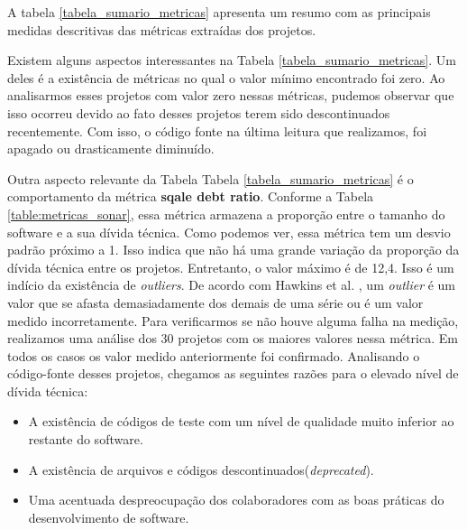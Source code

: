 A tabela \ref{tabela_sumario_metricas} apresenta um resumo com as principais medidas descritivas das métricas extraídas dos projetos. 

Existem alguns aspectos interessantes na Tabela \ref{tabela_sumario_metricas}. Um deles é a existência de métricas no qual o valor mínimo encontrado foi zero. Ao analisarmos esses projetos com valor zero nessas métricas, pudemos observar que isso ocorreu devido ao fato desses projetos terem sido descontinuados recentemente. Com isso, o código fonte na última leitura que realizamos, foi apagado ou drasticamente diminuído.  

Outra aspecto relevante da Tabela Tabela \ref{tabela_sumario_metricas} é o comportamento da métrica \textbf{sqale debt ratio}. Conforme a Tabela \ref{table:metricas_sonar}, essa métrica armazena a proporção entre o tamanho do software e a sua dívida técnica. Como podemos ver, essa métrica tem um desvio padrão próximo a 1. Isso indica que não há uma grande variação da proporção da dívida técnica entre os projetos.  Entretanto, o valor máximo é de 12,4. Isso é um indício da existência de \textit{outliers}. De acordo com Hawkins et al. \cite{hawkins1980identification}, um \textit{outlier} é um valor que se afasta demasiadamente dos demais de uma série ou é um valor medido incorretamente. Para verificarmos se não houve alguma falha na medição, realizamos uma análise dos 30 projetos com os maiores valores nessa métrica. Em todos os casos os valor medido anteriormente foi confirmado. Analisando o código-fonte desses projetos, chegamos as seguintes razões para o elevado nível de dívida técnica:

\begin{itemize}
\item A existência de códigos de teste com um nível de qualidade muito inferior ao restante do software.
\item A existência de arquivos e códigos descontinuados(\textit{deprecated}).
\item  Uma acentuada despreocupação dos colaboradores com as boas práticas do desenvolvimento de software.
\end{itemize}


